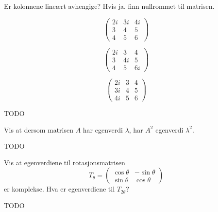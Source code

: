 
\begin{oppgave}
Er kolonnene lineært avhengige? Hvis ja, finn nullrommet til matrisen.
\begin{punkt}
\[
\begin{pmatrix}
2i & 3i & 4i \\ 3 & 4 & 5 \\ 4 & 5 & 6 
\end{pmatrix}
\]
\end{punkt}

\begin{punkt}
\[
\begin{pmatrix}
2i & 3 & 4 \\ 3 & 4i & 5 \\ 4 & 5 & 6i 
\end{pmatrix}
\]
\end{punkt}

\begin{punkt}
\[
\begin{pmatrix}
2i & 3 & 4 \\ 3i & 4 & 5 \\ 4i & 5 & 6 
\end{pmatrix}
\]
\end{punkt}
\end{oppgave}

\begin{losning}
TODO
\end{losning}


\begin{oppgave}
Vis at dersom matrisen $A$ har egenverdi $\lambda$, har $A^2$ egenverdi $\lambda^2$.
\end{oppgave}


\begin{losning}
TODO
\end{losning}

\begin{oppgave}
Vis at egenverdiene til rotasjonsmatrisen
\[
T_{\theta}=
\begin{pmatrix}
\cos \theta & -\sin \theta  \\ \sin \theta & \cos \theta  
\end{pmatrix}
\]
er komplekse. Hva er egenverdiene til $T_{2 \theta}$?
\end{oppgave}


\begin{losning}
TODO
\end{losning}

